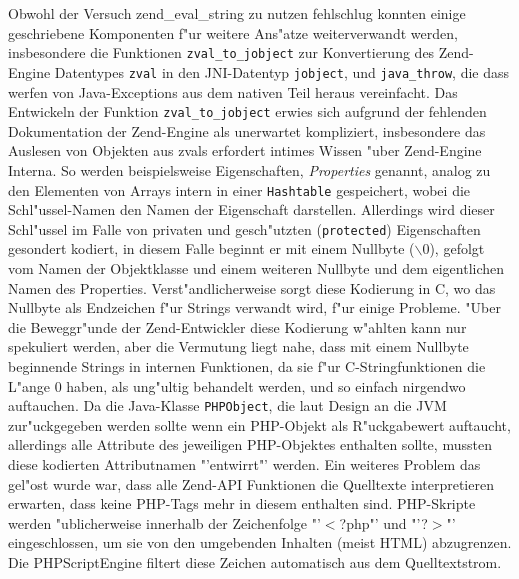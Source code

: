 Obwohl der Versuch zend\_eval\_string zu nutzen fehlschlug konnten einige geschriebene Komponenten f"ur weitere
Ans"atze weiterverwandt werden, insbesondere die Funktionen \texttt{zval\_to\_jobject} zur Konvertierung des Zend-Engine
Datentypes \texttt{zval} in den JNI-Datentyp \texttt{jobject}, und \texttt{java\_throw}, die dass werfen von Java-Exceptions
aus dem nativen Teil heraus vereinfacht. 
Das Entwickeln der Funktion \texttt{zval\_to\_jobject} erwies sich aufgrund der fehlenden Dokumentation der Zend-Engine als
unerwartet kompliziert, insbesondere das Auslesen von Objekten aus zvals erfordert intimes Wissen "uber Zend-Engine Interna.
So werden beispielsweise Eigenschaften, \emph{Properties} genannt, analog zu den Elementen von Arrays intern 
in einer \texttt{Hashtable} gespeichert, wobei die Schl"ussel-Namen den Namen der Eigenschaft darstellen. Allerdings wird
dieser Schl"ussel im Falle von privaten und gesch"utzten (\texttt{protected}) Eigenschaften gesondert kodiert, in diesem
Falle beginnt er mit einem Nullbyte ($\backslash$0), gefolgt vom Namen der Objektklasse und einem weiteren Nullbyte und dem eigentlichen
Namen des Properties. Verst"andlicherweise sorgt diese Kodierung in C, wo das Nullbyte als Endzeichen f"ur Strings verwandt wird,
f"ur einige Probleme. "Uber die Beweggr"unde der Zend-Entwickler diese Kodierung w"ahlten kann nur spekuliert werden, aber 
die Vermutung liegt nahe, dass mit einem Nullbyte beginnende Strings in internen Funktionen, da sie f"ur C-Stringfunktionen die L"ange 0 haben,
als ung"ultig behandelt werden, und so einfach nirgendwo auftauchen. Da die Java-Klasse \texttt{PHPObject}, die laut Design an die JVM
zur"uckgegeben werden sollte wenn ein PHP-Objekt als R"uckgabewert auftaucht, allerdings alle
Attribute des jeweiligen PHP-Objektes enthalten sollte, mussten diese kodierten Attributnamen "'entwirrt"' werden.
Ein weiteres Problem das gel"ost wurde war, dass alle Zend-API Funktionen die
Quelltexte interpretieren erwarten, dass keine PHP-Tags mehr in diesem enthalten sind. PHP-Skripte werden "ublicherweise
innerhalb der Zeichenfolge "'$<$?php"' und "'?$>$"' eingeschlossen, um sie von den umgebenden Inhalten (meist HTML) abzugrenzen.
Die PHPScriptEngine filtert diese Zeichen automatisch aus dem Quelltextstrom.

